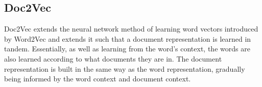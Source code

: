 \subsection{Doc2Vec}\label{ch2:Doc2Vec}

Doc2Vec \cite{Le2014a} extends the neural network method of learning word vectors introduced by Word2Vec \cite{Mikolov2013} and extends it such  that a document representation is learned in tandem. Essentially, as well as learning from the word's context, the words are also learned according to  what documents they are in. The document representation is built in the same way as the word representation, gradually being informed by the word context and document context.





